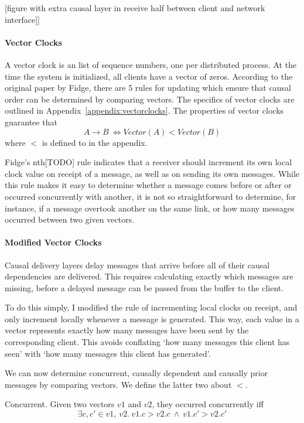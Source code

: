 \documentclass[12pt,a4paper,twoside,openright]{report}
\begin{document}
		[figure with extra causal layer in receive half between client and network interface]]
		
		\paragraph{Vector Clocks}
		A vector clock is an list of sequence numbers, one per distributed process. At the time the system is initialized, all clients have a vector of zeros. According to the original paper by Fidge, there are 5 rules for updating which ensure that causal order can be determined by comparing vectors. The specifics of vector clocks are outlined in Appendix~\ref{appendix:vectorclocks}. The properties of vector clocks guarantee that \[ A \rightarrow B\ \Leftrightarrow Vector(A) < Vector(B)\] where $<$ is defined to in the appendix.
		
		Fidge's nth[TODO] rule indicates that a receiver should increment its own local clock value on receipt of a message, as well as on sending its own messages. While this rule makes it easy to determine whether a message comes before or after or occurred concurrently with another, it is not so straightforward to determine, for instance, if a message overtook another on the same link, or how many messages occurred between two given vectors.
		
		\paragraph{Modified Vector Clocks}
		Causal delivery layers delay messages that arrive before all of their causal dependencies are delivered. This requires calculating exactly which messages are missing, before a delayed message can be passed from the buffer to the client.
		
		To do this simply, I modified the rule of incrementing local clocks on receipt, and only increment locally whenever a message is generated. This way, each value in a vector represents exactly how many messages have been sent by the corresponding client. This avoids conflating `how many messages this client has seen' with `how many messages this client has generated'.
		
		We can now determine concurrent, causally dependent and causally prior messages by comparing vectors. We define the latter two about $<$.
		
		Concurrent. Given two vectors $v1$ and $v2$, they occurred concurrently iff \[\exists c,c' \in v1,\ v2.\ v1.c > v2.c\ \land\ v1.c' > v2.c'\]
		
\end{document}
